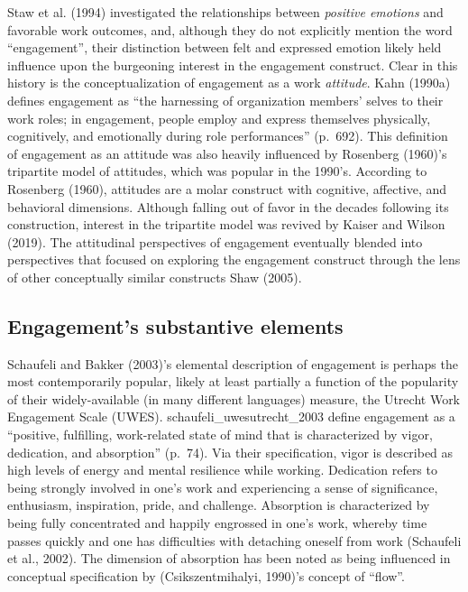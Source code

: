 \documentclass[
  man]{apa6}
\begin{document}
Staw et al. (1994) investigated the relationships between \emph{positive emotions} and favorable work outcomes, and, although they do not explicitly mention the word ``engagement'', their distinction between felt and expressed emotion likely held influence upon the burgeoning interest in the engagement construct. Clear in this history is the conceptualization of engagement as a work \emph{attitude}. Kahn (1990a) defines engagement as ``the harnessing of organization members' selves to their work roles; in engagement, people employ and express themselves physically, cognitively, and emotionally during role performances'' (p.~692). This definition of engagement as an attitude was also heavily influenced by Rosenberg (1960)'s tripartite model of attitudes, which was popular in the 1990's. According to Rosenberg (1960), attitudes are a molar construct with cognitive, affective, and behavioral dimensions. Although falling out of favor in the decades following its construction, interest in the tripartite model was revived by Kaiser and Wilson (2019). The attitudinal perspectives of engagement eventually blended into perspectives that focused on exploring the engagement construct through the lens of other conceptually similar constructs Shaw (2005).

\hypertarget{engagements-substantive-elements}{%
\subsection{Engagement's substantive elements}\label{engagements-substantive-elements}}

Schaufeli and Bakker (2003)'s elemental description of engagement is perhaps the most contemporarily popular, likely at least partially a function of the popularity of their widely-available (in many different languages) measure, the Utrecht Work Engagement Scale (UWES). schaufeli\_uwesutrecht\_2003 define engagement as a ``positive, fulfilling, work-related state of mind that is characterized by vigor, dedication, and absorption'' (p.~74). Via their specification, vigor is described as high levels of energy and mental resilience while working. Dedication refers to being strongly involved in one's work and experiencing a sense of significance, enthusiasm, inspiration, pride, and challenge. Absorption is characterized by being fully concentrated and happily engrossed in one's work, whereby time passes quickly and one has difficulties with detaching oneself from work (Schaufeli et al., 2002). The dimension of absorption has been noted as being influenced in conceptual specification by (Csikszentmihalyi, 1990)'s concept of ``flow''.
\end{document}
